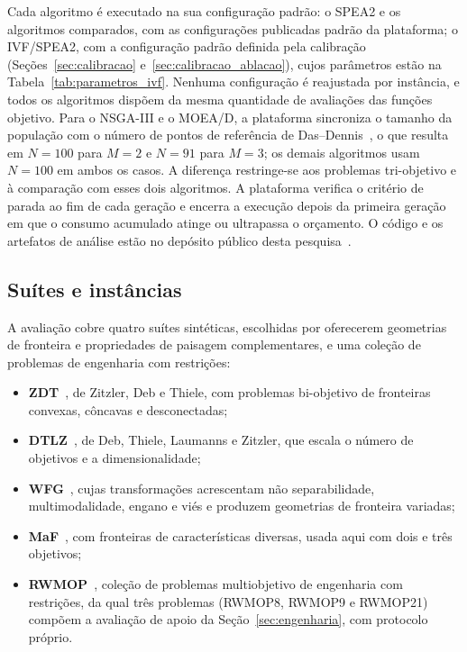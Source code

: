 Cada algoritmo é executado na sua configuração padrão: o SPEA2 e os algoritmos comparados, com as configurações publicadas padrão da plataforma; o IVF/SPEA2, com a configuração padrão definida pela calibração (Seções~\ref{sec:calibracao} e~\ref{sec:calibracao_ablacao}), cujos parâmetros estão na Tabela~\ref{tab:parametros_ivf}. Nenhuma configuração é reajustada por instância, e todos os algoritmos dispõem da mesma quantidade de avaliações das funções objetivo. Para o NSGA-III e o MOEA/D, a plataforma sincroniza o tamanho da população com o número de pontos de referência de Das--Dennis~\cite{das1998normal}, o que resulta em $N = 100$ para $M = 2$ e $N = 91$ para $M = 3$; os demais algoritmos usam $N = 100$ em ambos os casos. A diferença restringe-se aos problemas tri-objetivo e à comparação com esses dois algoritmos. A plataforma verifica o critério de parada ao fim de cada geração e encerra a execução depois da primeira geração em que o consumo acumulado atinge ou ultrapassa o orçamento. O código e os artefatos de análise estão no depósito público desta pesquisa~\cite{ivfspea2github}.

\subsection{Suítes e instâncias}
\label{sec:suites}

A avaliação cobre quatro suítes sintéticas, escolhidas por oferecerem geometrias de fronteira e propriedades de paisagem complementares, e uma coleção de problemas de engenharia com restrições:

\begin{itemize}
    \item \textbf{ZDT}~\cite{zitzler2000comparison}, de Zitzler, Deb e Thiele, com problemas bi-objetivo de fronteiras convexas, côncavas e desconectadas;
    \item \textbf{DTLZ}~\cite{deb2005scalable}, de Deb, Thiele, Laumanns e Zitzler, que escala o número de objetivos e a dimensionalidade;
    \item \textbf{WFG}~\cite{huband2006review}, cujas transformações acrescentam não separabilidade, multimodalidade, engano e viés e produzem geometrias de fronteira variadas;
    \item \textbf{MaF}~\cite{cheng2017benchmark}, com fronteiras de características diversas, usada aqui com dois e três objetivos;
    \item \textbf{RWMOP}~\cite{kumar2021benchmark}, coleção de problemas multiobjetivo de engenharia com restrições, da qual três problemas (RWMOP8, RWMOP9 e RWMOP21) compõem a avaliação de apoio da Seção~\ref{sec:engenharia}, com protocolo próprio.
\end{itemize}


